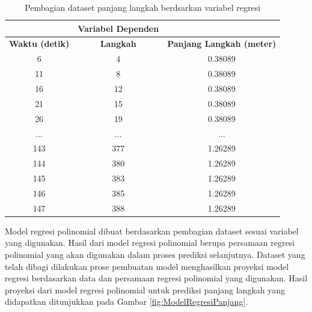 \begin{longtable}{|c|c|c|}
  \caption{Pembagian dataset panjang langkah berdsarkan variabel regresi}
  \label{tb:VariabelPrediksiPanjang}                                   \\
  \hline
  \rowcolor[HTML]{C0C0C0}
  \multicolumn{2}{|c|}{\textbf{Variabel Independen}}  & \textbf{Variabel Dependen}  \\
  \hline
  \rowcolor[HTML]{C0C0C0}
  \textbf{Waktu (detik)} & \textbf{Langkah} & \textbf{Panjang Langkah (meter)} \\
  \hline
  6    & 4    & 0.38089      \\
  \hline
  11    & 8    & 0.38089     \\
  \hline
  16    & 12    & 0.38089     \\
  \hline
  21    & 15    & 0.38089     \\
  \hline
  26    & 19    & 0.38089     \\
  \hline
  ...    & ...    & ...     \\
  \hline
  143    & 377    & 1.26289     \\
  \hline
  144    & 380    & 1.26289     \\
  \hline
  145    & 383    & 1.26289     \\
  \hline
  146    & 385    & 1.26289     \\
  \hline
  147    & 388    & 1.26289     \\
  \hline
\end{longtable}
\clearpage

Model regresi polinomial dibuat berdasarkan pembagian dataset sesuai variabel yang digunakan. Hasil dari model regresi polinomial berupa persamaan regresi polinomial yang akan digunakan dalam proses prediksi selanjutnya. Dataset yang telah dibagi dilakukan prose pembuatan model menghasilkan proyeksi model regresi berdasarkan data dan persamaan regresi polinomial yang digunakan. Hasil proyeksi dari model regresi polinomial untuk prediksi panjang langkah yang didapatkan ditunjukkan pada Gambar \ref{fig:ModelRegresiPanjang}.

